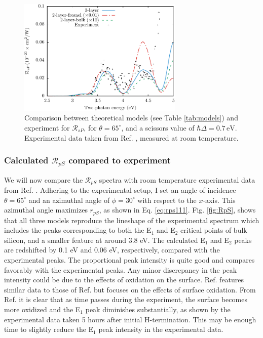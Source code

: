 \begin{figure}[t]
\centering
\includegraphics[width=0.7\textwidth]{content/figures/fig-Si1x1-Mejia_RsP}
\caption{Comparison between theoretical models (see Table \ref{tab:models}) and
experiment for $\mathcal{R}_{sP}$, for $\theta=65^{\circ}$, and a scissors value
of $\hbar\Delta = 0.7\,\text{eV}$. Experimental data taken from Ref.
\cite{mejiaPRB02}, measured at room temperature.}
\label{fig:RsP}
\end{figure}



\subsubsection{Calculated \texorpdfstring{$\mathcal{R}_{pS}$}{RpS} compared to 
experiment}\label{sec:1x1RpS}

We will now compare the $\mathcal{R}_{pS}$ spectra with room temperature
experimental data from Ref. \cite{mejiaPRB02}. Adhering to the experimental
setup, I set an angle of incidence $\theta=65^{\circ}$ and an azimuthal angle of
$\phi=30^\circ$ with respect to the $x$-axis. This azimuthal angle maximizes
$r_{pS}$, as shown in Eq. \eqref{eq:rps111}. Fig. \ref{fig:RpS}, shows that all
three models reproduce the lineshape of the experimental spectrum which includes
the peaks corresponding to both the E$_{1}$ and E$_{2}$ critical points of bulk
silicon, and a smaller feature at around 3.8 eV. The calculated E$_{1}$ and
E$_{2}$ peaks are redshifted by 0.1 eV and 0.06 eV, respectively, compared with
the experimental peaks. The proportional peak intensity is quite good and
compares favorably with the experimental peaks. Any minor discrepancy in the
peak intensity could be due to the effects of oxidation on the surface. Ref.
\cite{bergfeldPRL04} features similar data to those of Ref. \cite{mejiaPRB02}
but focuses on the effects of surface oxidation. From Ref. \cite{bergfeldPRL04}
it is clear that as time passes during the experiment, the surface becomes more
oxidized and the E$_{1}$ peak diminishes substantially, as shown by the
experimental data taken 5 hours after initial H-termination. This may be enough
time to slightly reduce the E$_{1}$ peak intensity in the experimental data.

